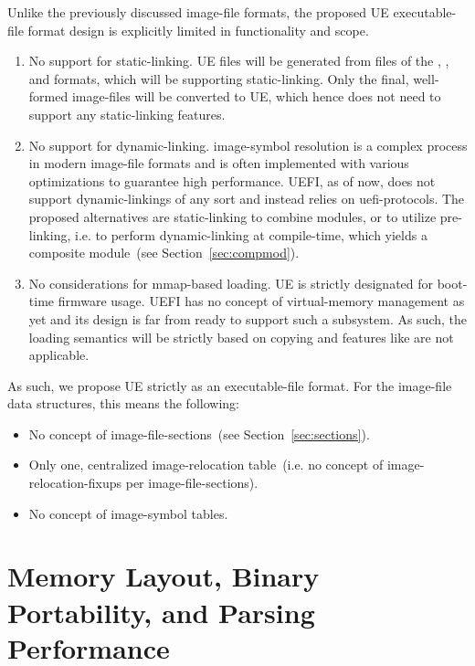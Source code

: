 Unlike the previously discussed \gls{image-file} formats, the proposed \gls{UE} \gls{executable-file} format design is explicitly limited in functionality and scope.

\begin{enumerate}
  \item No support for \gls{static-linking}. \gls{UE} files will be generated from files of the , , and  formats, which will be supporting \gls{static-linking}. Only the final, well-formed \glspl{image-file} will be converted to \gls{UE}, which hence does not need to support any \gls{static-linking} features.
  \item No support for \gls{dynamic-linking}. \Gls{image-symbol} resolution is a complex process in modern \gls{image-file} formats and is often implemented with various optimizations to guarantee high performance. \gls{UEFI}, as of now, does not support \glspl{dynamic-linking} of any sort and instead relies on \glspl{uefi-protocol}. %
  The proposed alternatives are \gls{static-linking} to combine modules, or to utilize pre-linking, i.e. to perform \gls{dynamic-linking} at compile-time, which yields a composite module~(see Section~\ref{sec:compmod}).
  \item No considerations for \gls{mmap}-based loading. \gls{UE} is strictly designated for boot-time \gls{firmware} usage. \gls{UEFI} has no concept of \gls{virtual-memory} management as yet and its design is far from ready to support such a subsystem. As such, the loading semantics will be strictly based on copying and features like  are not applicable.
\end{enumerate}

As such, we propose \gls{UE} strictly as an \gls{executable-file} format. For the \gls{image-file} data structures, this means the following:

\begin{itemize}
  \item No concept of \glspl{image-file-section}~(see Section~\ref{sec:sections}).
  \item Only one, centralized \gls{image-relocation} table~(i.e. no concept of \glspl{image-relocation-fixup} per \glspl{image-file-section}).
  \item No concept of \gls{image-symbol} tables.
\end{itemize}

\section{Memory Layout, Binary Portability, and Parsing Performance}

